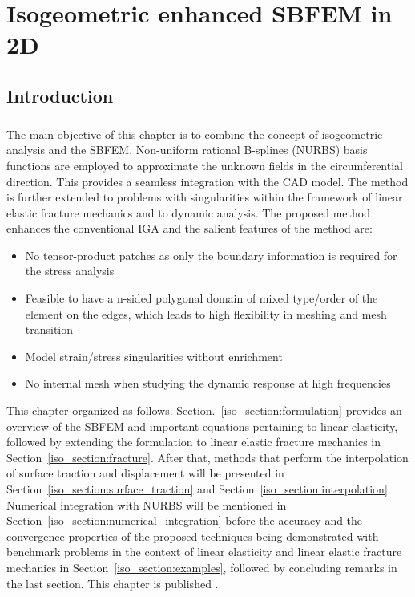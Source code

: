 \chapter{Isogeometric enhanced SBFEM in 2D}
\label{Iso_sec:main}
\section{Introduction}
\paragraph{}
The main objective of this chapter is to combine the concept of isogeometric analysis and the SBFEM.
Non-uniform rational B-splines (NURBS) basis functions are employed to approximate the unknown fields in the circumferential direction.
This provides a seamless integration with the CAD model.
The method is further extended to problems with singularities within the framework of linear elastic fracture mechanics and to dynamic analysis.
The proposed method enhances the conventional IGA and the salient features of the method are:
    \begin{itemize}
        \item No tensor-product patches as only the boundary information is required for the stress analysis
        \item Feasible to have a n-sided polygonal domain of mixed type/order of the element on the edges, 
                which leads to high flexibility in meshing and mesh transition
        \item Model strain/stress singularities without enrichment
        \item No internal mesh when studying the dynamic response at high frequencies
    \end{itemize}


This chapter organized as follows.
Section.~\ref{iso_section:formulation} provides an overview of the SBFEM and important equations pertaining to linear elasticity,
followed by extending the formulation to linear elastic fracture mechanics in Section~\ref{iso_section:fracture}.
After that, methods that perform the interpolation of surface traction and displacement will be presented in Section~\ref{iso_section:surface_traction} and Section~\ref{iso_section:interpolation}.
Numerical integration with NURBS will be mentioned in Section~\ref{iso_section:numerical_integration} before the accuracy and the convergence properties of the proposed techniques being demonstrated with benchmark problems in the context of linear elasticity and linear elastic fracture mechanics in Section~\ref{iso_section:examples}, followed by concluding remarks in the last section.
This chapter is published \citep{NATARAJAN2015733}.




  
